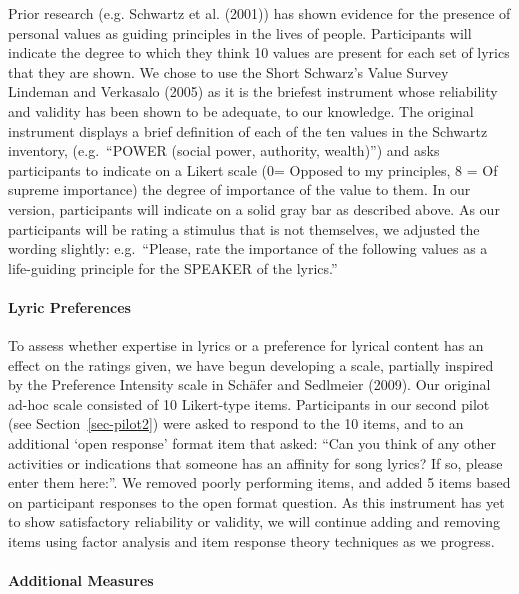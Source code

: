 \documentclass[
  letterpaper,
  DIV=11,
  numbers=noendperiod]{scrartcl}
\let\oldparagraph\paragraph
\renewcommand{\paragraph}[1]{\oldparagraph{#1}\mbox{}}
\begin{document}
Prior research (e.g. Schwartz et al. (2001)) has shown evidence for the
presence of personal values as guiding principles in the lives of
people. Participants will indicate the degree to which they think 10
values are present for each set of lyrics that they are shown. We chose
to use the Short Schwarz's Value Survey Lindeman and Verkasalo (2005) as
it is the briefest instrument whose reliability and validity has been
shown to be adequate, to our knowledge. The original instrument displays
a brief definition of each of the ten values in the Schwartz inventory,
(e.g.~``POWER (social power, authority, wealth)'') and asks participants
to indicate on a Likert scale (0= Opposed to my principles, 8 = Of
supreme importance) the degree of importance of the value to them. In
our version, participants will indicate on a solid gray bar as described
above. As our participants will be rating a stimulus that is not
themselves, we adjusted the wording slightly: e.g.~``Please, rate the
importance of the following values as a life-guiding principle for the
SPEAKER of the lyrics.''

\hypertarget{lyric-preferences}{%
\paragraph{Lyric Preferences}\label{lyric-preferences}}

To assess whether expertise in lyrics or a preference for lyrical
content has an effect on the ratings given, we have begun developing a
scale, partially inspired by the Preference Intensity scale in Schäfer
and Sedlmeier (2009). Our original ad-hoc scale consisted of 10
Likert-type items. Participants in our second pilot (see
Section~\ref{sec-pilot2}) were asked to respond to the 10 items, and to
an additional `open response' format item that asked: ``Can you think of
any other activities or indications that someone has an affinity for
song lyrics? If so, please enter them here:''. We removed poorly
performing items, and added 5 items based on participant responses to
the open format question. As this instrument has yet to show
satisfactory reliability or validity, we will continue adding and
removing items using factor analysis and item response theory techniques
as we progress.

\hypertarget{additional-measures}{%
\paragraph{Additional Measures}\label{additional-measures}}
\end{document}
